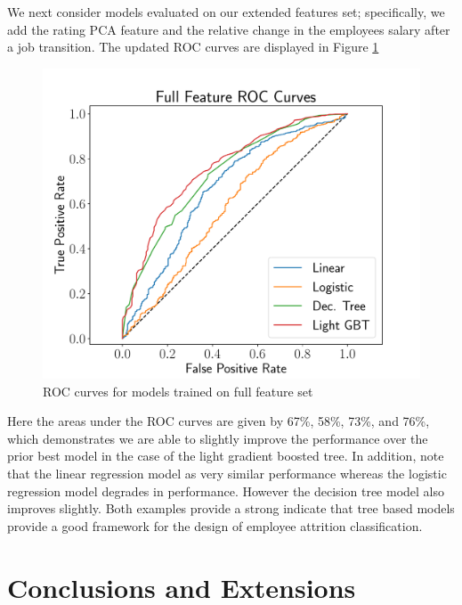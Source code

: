 \documentclass[10pt]{article}
\begin{document}
We next consider models evaluated on our extended features set; specifically, we add the 
rating PCA feature and the relative change in the employees salary after a job transition. 
The updated ROC curves are displayed in Figure \ref{fig:fullroc}
%
\begin{figure}[thb]
    \centering
	\includegraphics[width=1.0\linewidth]{fullROC.pdf}
	\caption{ROC curves for models trained on full feature set}
	\label{fig:fullroc}
\end{figure}
%
Here the areas under the ROC curves are given by 67\%, 58\%, 73\%, and 76\%, which demonstrates 
we are able to slightly improve the performance over the prior best model in the case of the 
light gradient boosted tree.  In addition, note that the linear regression model as very similar 
performance whereas the logistic regression model degrades in performance.  However the decision 
tree model also improves slightly.  Both examples provide a strong indicate that tree based models 
provide a good framework for the design of employee attrition classification. 

\section{Conclusions and Extensions}
\end{document}
